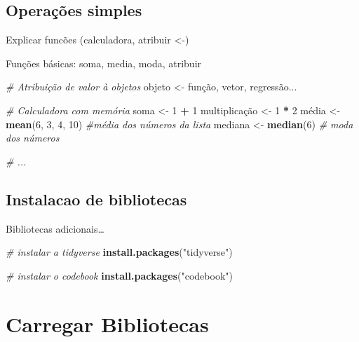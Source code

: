 \documentclass[
]{book}
\newenvironment{Shaded}{\begin{snugshade}}{\end{snugshade}}
\newcommand{\CommentTok}[1]{\textcolor[rgb]{0.56,0.35,0.01}{\textit{#1}}}
\newcommand{\DecValTok}[1]{\textcolor[rgb]{0.00,0.00,0.81}{#1}}
\newcommand{\KeywordTok}[1]{\textcolor[rgb]{0.13,0.29,0.53}{\textbf{#1}}}
\newcommand{\NormalTok}[1]{#1}
\newcommand{\OperatorTok}[1]{\textcolor[rgb]{0.81,0.36,0.00}{\textbf{#1}}}
\newcommand{\StringTok}[1]{\textcolor[rgb]{0.31,0.60,0.02}{#1}}
\begin{document}
\hypertarget{operauxe7uxf5es-simples}{%
\section{Operações simples}\label{operauxe7uxf5es-simples}}

Explicar funcões (calculadora, atribuir \textless-)

Funções básicas: soma, media, moda, atribuir

\begin{Shaded}
\begin{Highlighting}[]
\CommentTok{# Atribuição de valor à objetos}
\NormalTok{objeto <-}\StringTok{ }\NormalTok{função, vetor, regressão...}

\CommentTok{# Calculadora com memória}
\NormalTok{soma <-}\StringTok{ }\DecValTok{1} \OperatorTok{+}\StringTok{ }\DecValTok{1}
\NormalTok{multiplicação <-}\StringTok{ }\DecValTok{1} \OperatorTok{*}\StringTok{ }\DecValTok{2}
\NormalTok{média <-}\StringTok{ }\KeywordTok{mean}\NormalTok{(}\DecValTok{6}\NormalTok{, }\DecValTok{3}\NormalTok{, }\DecValTok{4}\NormalTok{, }\DecValTok{10}\NormalTok{) }\CommentTok{#média dos números da lista}
\NormalTok{mediana <-}\StringTok{ }\KeywordTok{median}\NormalTok{(}\DecValTok{6}\NormalTok{) }\CommentTok{# moda dos números}

\CommentTok{# ...}
\end{Highlighting}
\end{Shaded}

\hypertarget{instalacao-de-bibliotecas}{%
\section{Instalacao de bibliotecas}\label{instalacao-de-bibliotecas}}

Bibliotecas adicionais\ldots{}

\begin{Shaded}
\begin{Highlighting}[]
\CommentTok{# instalar a tidyverse}
\KeywordTok{install.packages}\NormalTok{(}\StringTok{"tidyverse"}\NormalTok{)}

\CommentTok{# instalar o codebook}
\KeywordTok{install.packages}\NormalTok{(}\StringTok{"codebook"}\NormalTok{)}
\end{Highlighting}
\end{Shaded}

\hypertarget{carregar-bibliotecas}{%
\chapter{Carregar Bibliotecas}\label{carregar-bibliotecas}}
\end{document}
